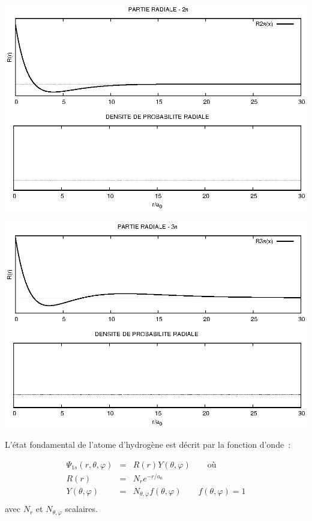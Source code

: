 \begin{center}
\includegraphics[angle=90,width=\textwidth]{figure/rad2s.eps}
\end{center}
\clearpage

\begin{center}
\includegraphics[angle=90,width=\textwidth]{figure/rad3s.eps}
\end{center}
\clearpage


L'\'etat fondamental de l'atome d'hydrog\`ene est d\'ecrit par la fonction d'onde~:

\[
\begin{array}{rcl}
\Psi_{1s}(r,\theta,\varphi) &=& R(r) Y(\theta,\varphi) \qquad \text{o\`u}\\[0.3cm]
R(r)                        &=& N_r e^{-r/a_0}        \\
Y(\theta,\varphi)           &=& N_{\theta,\varphi} f(\theta,\varphi) \qquad f(\theta,\varphi) = 1\\
\end{array}
\]
avec $N_r$ et $N_{\theta,\varphi}$ scalaires.


